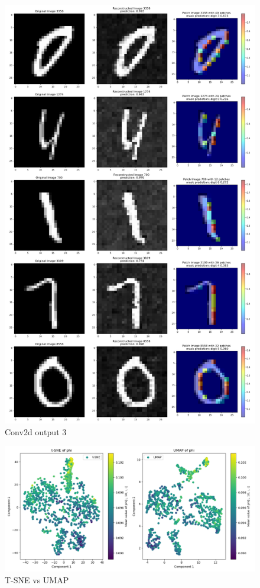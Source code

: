\documentclass[12pt]{article}
\begin{document}
\begin{figure}[H]
    \centering
    \includegraphics[width=0.8\linewidth]{../fig-mask-collection/ID_8558_Original_Reconstructed_Patch_1.png} %
    \caption{Conv2d output 3}
    \label{fig:exp3}
\end{figure}


\begin{figure}[H]
    \centering
    \includegraphics[width=1\linewidth]{../fig-mask-collection/t-SNE_vs_UMAP.png} %
    \caption{T-SNE vs UMAP}
    \label{fig:t-SNE}
\end{figure}
\end{document}
